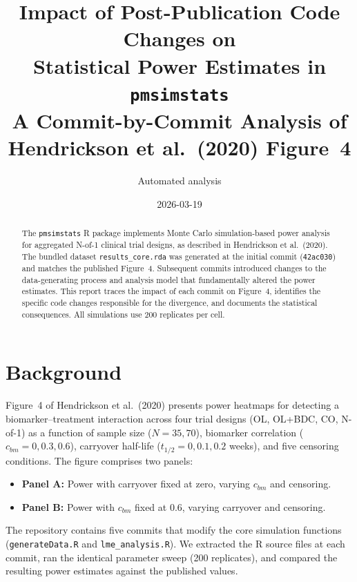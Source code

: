 \documentclass[11pt]{article}
\title{Impact of Post-Publication Code Changes on \\
       Statistical Power Estimates in \texttt{pmsimstats} \\[6pt]
       \large A Commit-by-Commit Analysis of Hendrickson et al.\
       (2020) Figure~4}
\author{Automated analysis}
\date{2026-03-19}
\begin{document}
\maketitle
\thispagestyle{fancy}

\begin{abstract}
The \texttt{pmsimstats} R package implements Monte Carlo
simulation-based power analysis for aggregated N-of-1 clinical
trial designs, as described in Hendrickson et al.\ (2020). The
bundled dataset \texttt{results\_core.rda} was generated at the
initial commit (\texttt{42ac030}) and matches the published
Figure~4. Subsequent commits introduced changes to the
data-generating process and analysis model that fundamentally
altered the power estimates. This report traces the impact of
each commit on Figure~4, identifies the specific code changes
responsible for the divergence, and documents the statistical
consequences. All simulations use 200 replicates per cell.
\end{abstract}

\tableofcontents
\newpage

\section{Background}

Figure~4 of Hendrickson et al.\ (2020) presents power heatmaps
for detecting a biomarker--treatment interaction across four trial
designs (OL, OL+BDC, CO, N-of-1) as a function of sample size
($N = 35, 70$), biomarker correlation ($c_{bm} = 0, 0.3, 0.6$),
carryover half-life ($t_{1/2} = 0, 0.1, 0.2$ weeks), and five
censoring conditions. The figure comprises two panels:

\begin{itemize}
\item \textbf{Panel A:} Power with carryover fixed at zero,
  varying $c_{bm}$ and censoring.
\item \textbf{Panel B:} Power with $c_{bm}$ fixed at 0.6,
  varying carryover and censoring.
\end{itemize}

The repository contains five commits that modify the core
simulation functions (\texttt{generateData.R} and
\texttt{lme\_analysis.R}). We extracted the R source files at each
commit, ran the identical parameter sweep (200 replicates), and
compared the resulting power estimates against the published
values.
\end{document}
